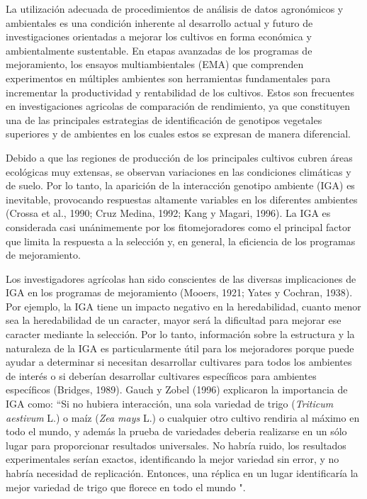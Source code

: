 La utilización adecuada de procedimientos de análisis de datos agronómicos y ambientales es una condición inherente al desarrollo actual y futuro de investigaciones orientadas a mejorar los cultivos en forma económica y ambientalmente sustentable. En etapas avanzadas de los programas de mejoramiento, los ensayos multiambientales (EMA) que comprenden experimentos en múltiples ambientes son herramientas fundamentales para incrementar la productividad y rentabilidad de los cultivos. Estos son frecuentes en investigaciones agricolas de comparación de rendimiento, ya que constituyen una de las principales estrategias de identificación de genotipos vegetales superiores y de ambientes en los cuales estos se expresan de manera diferencial.

Debido a que las regiones de producción de los principales cultivos cubren áreas ecológicas muy extensas, se observan variaciones en las condiciones climáticas y de suelo. Por lo tanto, la aparición de la interacción genotipo ambiente (IGA) es inevitable, provocando respuestas altamente variables en los diferentes ambientes (Crossa et al., 1990; Cruz Medina, 1992; Kang y Magari, 1996). La IGA es considerada casi unánimemente por los fitomejoradores como el principal factor que limita la respuesta a la selección y, en general, la eficiencia de los programas de mejoramiento. 

Los investigadores agrícolas han sido conscientes de las diversas implicaciones de IGA en los programas de mejoramiento (Mooers, 1921; Yates y Cochran, 1938). Por ejemplo, la IGA tiene un impacto negativo en la heredabilidad, cuanto menor sea la heredabilidad de un caracter, mayor será la dificultad para mejorar ese caracter mediante la selección.
Por lo tanto, información sobre la estructura y la naturaleza de la IGA es particularmente útil para los mejoradores porque puede ayudar a determinar si necesitan desarrollar cultivares para todos los ambientes de interés o si deberían desarrollar cultivares específicos para ambientes específicos (Bridges, 1989). Gauch y Zobel (1996) explicaron la importancia de IGA como: “Si no hubiera interacción, una sola variedad de trigo (\emph{Triticum aestivum} L.) o maíz (\emph{Zea mays} L.) o cualquier otro cultivo rendiria al máximo en todo el mundo, y además la prueba de variedades deberia realizarse en un sólo lugar para proporcionar resultados universales. No habría ruido, los resultados experimentales serían exactos, identificando la mejor variedad sin error, y no habría necesidad de replicación. Entonces, una réplica en un lugar identificaría la mejor variedad de trigo que florece en todo el mundo ".

